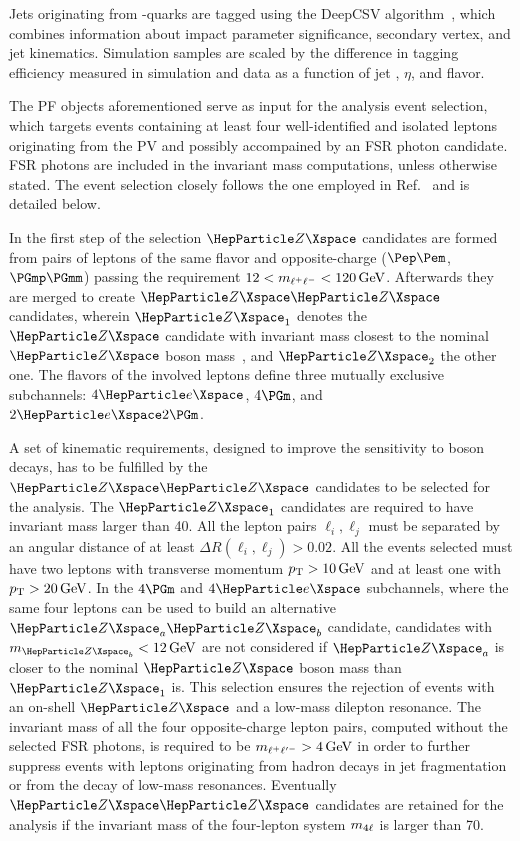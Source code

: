Jets originating from {\PQqb}-quarks are tagged using the DeepCSV algorithm~\cite{Sirunyan:2017ezt}, which combines information about impact parameter significance, secondary vertex, and jet kinematics.
Simulation samples are scaled by the difference in {\PQqb} tagging efficiency measured in simulation and data as a function of jet \pt, $\eta$, and flavor.

The PF objects aforementioned serve as input for the analysis event selection, which targets events containing at least four well-identified and isolated leptons originating from the PV and possibly accompained by an FSR photon candidate. FSR photons are included in the invariant mass computations, unless otherwise stated.
The event selection closely follows the one employed in Ref.~\cite{CMSHIG19001} and is detailed below.
 
In the first step of the selection $\PZ$ candidates are formed from pairs of leptons of the same flavor and opposite-charge ($\Pep\Pem$, $\PGmp\PGmm$) passing the requirement $12 < m_{\ell^{+}\ell^{-}}  < 120\,\text{Ge\hspace{-.08em}V}$. 
Afterwards they are merged to create $\PZ\PZ$ candidates, wherein $\PZ_1$ denotes the $\PZ$ candidate with invariant mass closest to the nominal $\PZ$ boson mass~\cite{Zyla:2020zbs}, and $\PZ_2$ the other one.
The flavors of the involved leptons define three mutually exclusive subchannels: $4\Pe$, $4\Pgm$, and $2\Pe 2\Pgm$.

A set of kinematic requirements, designed to improve the sensitivity to \PH boson decays, has to be fulfilled by the $\PZ\PZ$ candidates to be selected for the analysis.
The $\PZ_1$ candidates are required to have invariant mass larger than 40\GeV.
All the lepton pairs $\ell_i, \ell_j$ must be separated by an angular distance of at least $\Delta R(\ell_i, \ell_j) > 0.02$.
All the events selected must have two leptons with transverse momentum $p_{\mathrm{T}} > 10\,\text{Ge\hspace{-.08em}V}$ and at least one with $p_{\mathrm{T}} > 20\,\text{Ge\hspace{-.08em}V}$.	
In the $4\Pgm$ and $4\Pe$ subchannels, where the same four leptons can be used to build an alternative $\PZ_a \PZ_b$ candidate, candidates with $m_{\PZ_b}<12\GeV$ are not considered if $\PZ_a$ is closer to the nominal $\PZ$ boson mass than $\PZ_1$ is. This selection ensures the rejection of events with an on-shell $\PZ$ and a low-mass dilepton resonance.
The invariant mass of all the four opposite-charge lepton pairs, computed without the selected FSR photons, is required to be $m_{\ell^{+}\ell'^{-}} > 4\,\text{Ge\hspace{-.08em}V}$ in order to further suppress events with leptons originating from hadron decays in jet fragmentation or from the decay of low-mass resonances.
Eventually $\PZ\PZ$ candidates are retained for the analysis if the invariant mass of the four-lepton system $m_{4\ell}$ is larger than 70\GeV.

